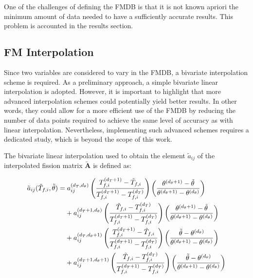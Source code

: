 \documentclass[preprint,review,12pt]{elsarticle}
\begin{document}
One of the challenges of defining the FMDB is that it is not known apriori the minimum amount of data needed to have a sufficiently accurate results. This problem is accounted in the results section.   

\subsection{FM Interpolation}
Since two variables are considered to vary in the FMDB, a bivariate interpolation scheme is required. As a preliminary approach, a simple bivariate linear interpolation is adopted. However, it is important to highlight that more advanced interpolation schemes could potentially yield better results. In other words, they could allow for a more efficient use of the FMDB by reducing the number of data points required to achieve the same level of accuracy as with linear interpolation. Nevertheless, implementing such advanced schemes requires a dedicated study, which is beyond the scope of this work.

The bivariate linear interpolation used to obtain the element $\tilde{a}_{ij}$ of the interpolated fission matrix $\tilde{\mathbf{A}}$ is defined as:

\begin{align}
\tilde{a}_{ij}(\tilde{T}_{f,i}, \tilde{\theta}) =&\; a_{ij}^{(d_T, d_{\theta})}
\left( \frac{T_{f,i}^{(d_T+1)} - \tilde{T}_{f,i}}{T_{f,i}^{(d_T+1)} - T_{f,i}^{(d_T)}} \right)
\left( \frac{\theta^{(d_{\theta}+1)} - \tilde{\theta}}{\theta^{(d_{\theta}+1)} - \theta^{(d_{\theta})}} \right) \notag \\
&+ a_{ij}^{(d_T+1, d_{\theta})}
\left( \frac{\tilde{T}_{f,i} - T_{f,i}^{(d_T)}}{T_{f,i}^{(d_T+1)} - T_{f,i}^{(d_T)}} \right)
\left( \frac{\theta^{(d_{\theta}+1)} - \tilde{\theta}}{\theta^{(d_{\theta}+1)} - \theta^{(d_{\theta})}} \right) \notag \\
&+ a_{ij}^{(d_T, d_{\theta}+1)}
\left( \frac{T_{f,i}^{(d_T+1)} - \tilde{T}_{f,i}}{T_{f,i}^{(d_T+1)} - T_{f,i}^{(d_T)}} \right)
\left( \frac{\tilde{\theta} - \theta^{(d_{\theta})}}{\theta^{(d_{\theta}+1)} - \theta^{(d_{\theta})}} \right) \notag \\
&+ a_{ij}^{(d_T+1, d_{\theta}+1)}
\left( \frac{\tilde{T}_{f,i} - T_{f,i}^{(d_T)}}{T_{f,i}^{(d_T+1)} - T_{f,i}^{(d_T)}} \right)
\left( \frac{\tilde{\theta} - \theta^{(d_{\theta})}}{\theta^{(d_{\theta}+1)} - \theta^{(d_{\theta})}} \right)
\end{align}
\end{document}

